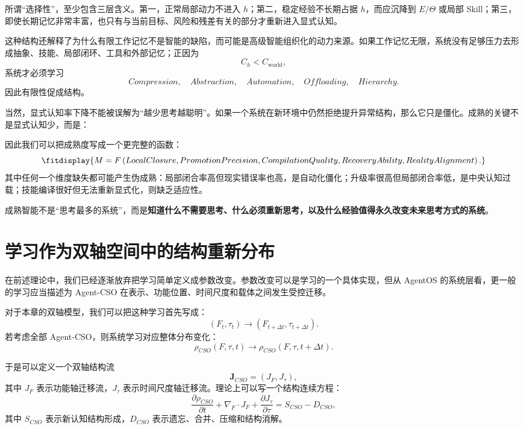 所谓“选择性”，至少包含三层含义。第一，正常局部动力不进入 $h$；第二，稳定经验不长期占据 $h$，而应沉降到 $E/\Theta$ 或局部 Skill；第三，即使长期记忆非常丰富，也只有与当前目标、风险和残差有关的部分才重新进入显式认知。

这种结构还解释了为什么有限工作记忆不是智能的缺陷，而可能是高级智能组织化的动力来源。如果工作记忆无限，系统没有足够压力去形成抽象、技能、局部闭环、工具和外部记忆；正因为
\[
C_h<C_{\mathrm{world}},
\]
系统才必须学习
\[
Compression,
\quad
Abstraction,
\quad
Automation,
\quad
Offloading,
\quad
Hierarchy.
\]
因此有限性促成结构。

当然，显式认知率下降不能被误解为“越少思考越聪明”。如果一个系统在新环境中仍然拒绝提升异常结构，那么它只是僵化。成熟的关键不是显式认知少，而是：
\begin{statementbox}
\centering
{}
\end{statementbox}

因此我们可以把成熟度写成一个更完整的函数：
\[
\fitdisplay{
M
=
F
\left(
LocalClosure,
PromotionPrecision,
CompilationQuality,
RecoveryAbility,
RealityAlignment
\right).
}
\]
其中任何一个维度缺失都可能产生伪成熟：局部闭合率高但现实错误率也高，是自动化僵化；升级率很高但局部闭合率低，是中央认知过载；技能编译很好但无法重新显式化，则缺乏适应性。

成熟智能不是“思考最多的系统”，而是\textbf{知道什么不需要思考、什么必须重新思考，以及什么经验值得永久改变未来思考方式的系统}。


\section{学习作为双轴空间中的结构重新分布}

在前述理论中，我们已经逐渐放弃把学习简单定义成参数改变。参数改变可以是学习的一个具体实现，但从 AgentOS 的系统层看，更一般的学习应当描述为 Agent-CSO 在表示、功能位置、时间尺度和载体之间发生受控迁移。

对于本章的双轴模型，我们可以把这种学习首先写成：
\[
(F_t,\tau_t)
\rightarrow
(F_{t+\Delta t},\tau_{t+\Delta t}).
\]
若考虑全部 Agent-CSO，则系统学习对应整体分布变化：
\[
\rho_{CSO}(F,\tau,t)
\rightarrow
\rho_{CSO}(F,\tau,t+\Delta t).
\]

于是可以定义一个双轴结构流
\[
\mathbf J_{CSO}
=
\left(
J_F,
J_\tau
\right),
\]
其中 $J_F$ 表示功能轴迁移流，$J_\tau$ 表示时间尺度轴迁移流。理论上可以写一个结构连续方程：
\[
\frac{\partial \rho_{CSO}}{\partial t}
+
\nabla_F\cdot J_F
+
\frac{\partial J_\tau}{\partial \tau}
=
S_{CSO}
-
D_{CSO},
\]
其中 $S_{CSO}$ 表示新认知结构形成，$D_{CSO}$ 表示遗忘、合并、压缩和结构消解。

